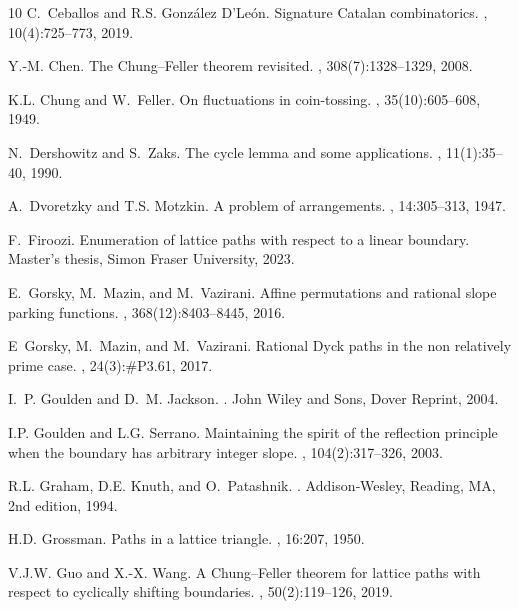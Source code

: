 \documentclass[11pt]{article}
\theoremstyle{definition} %
\numberwithin{equation}{section}
\begin{document}
\begin{thebibliography}{10}
C.~Ceballos and R.S. {González D'León}.
\newblock Signature {C}atalan combinatorics.
, 10(4):725–773, 2019.

Y.-M. Chen.
\newblock The {C}hung--{F}eller theorem revisited.
, 308(7):1328--1329, 2008.

K.L. Chung and W.~Feller.
\newblock On fluctuations in coin-tossing.
, 35(10):605--608, 1949.

N.~Dershowitz and S.~Zaks.
\newblock The cycle lemma and some applications.
, 11(1):35--40, 1990.

A.~Dvoretzky and T.S. Motzkin.
\newblock A problem of arrangements.
, 14:305--313, 1947.

F.~Firoozi.
\newblock Enumeration of lattice paths with respect to a linear boundary.
\newblock Master's thesis, Simon Fraser University, 2023.

E.~Gorsky, M.~Mazin, and M.~Vazirani.
\newblock Affine permutations and rational slope parking functions.
, 368(12):8403–8445, 2016.

E~Gorsky, M.~Mazin, and M.~Vazirani.
\newblock Rational {D}yck paths in the non relatively prime case.
, 24(3):\#P3.61, 2017.

I.~P. Goulden and D.~M. Jackson.
.
\newblock John Wiley and Sons, Dover Reprint, 2004.

I.P. Goulden and L.G. Serrano.
\newblock Maintaining the spirit of the reflection principle when the boundary
  has arbitrary integer slope.
, 104(2):317--326, 2003.

R.L. Graham, D.E. Knuth, and O.~Patashnik.
.
\newblock Addison‐Wesley, Reading, MA, 2nd edition, 1994.

H.D. Grossman.
\newblock Paths in a lattice triangle.
, 16:207, 1950.

V.J.W. Guo and X.-X. Wang.
\newblock A {C}hung--{F}eller theorem for lattice paths with respect to
  cyclically shifting boundaries.
, 50(2):119--126, 2019.


\end{thebibliography}
\end{document}
